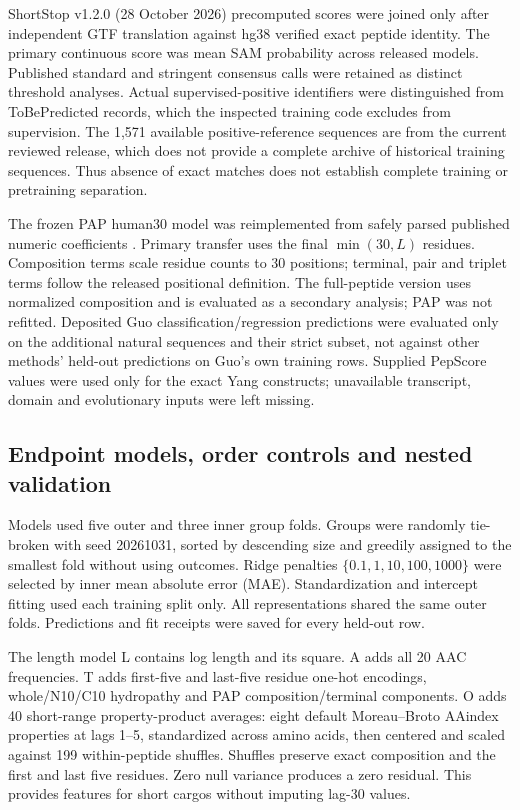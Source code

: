\documentclass[11pt,a4paper]{article}
\begin{document}
ShortStop v1.2.0 (28 October 2026) precomputed scores were joined only after
independent GTF translation against hg38 verified exact peptide identity.
The primary continuous score was mean SAM probability across released models.
Published standard and stringent consensus calls were retained as distinct
threshold analyses. Actual supervised-positive identifiers were distinguished
from ToBePredicted records, which the inspected training code excludes from
supervision. The 1,571 available positive-reference sequences are from the current reviewed release, which does not provide a complete archive of historical training sequences. Thus absence
of exact matches does not establish complete training or pretraining separation.

The frozen PAP human30 model was reimplemented from safely parsed published
numeric coefficients \cite{voutsinos}. Primary transfer uses the final
$\min(30,L)$ residues. Composition terms scale residue counts to 30 positions;
terminal, pair and triplet terms follow the released positional definition.
The full-peptide version uses normalized composition and is evaluated as a secondary analysis; PAP was not refitted. Deposited Guo classification/regression predictions
were evaluated only on the additional natural sequences and their strict
subset, not against other methods' held-out predictions on Guo's own training
rows. Supplied PepScore values were used only for the exact Yang constructs;
unavailable transcript, domain and evolutionary inputs were left missing.

\subsection{Endpoint models, order controls and nested validation}
Models used five outer and three inner group folds. Groups were randomly
tie-broken with seed 20261031, sorted by descending size and greedily assigned
to the smallest fold without using outcomes. Ridge penalties
$\{0.1,1,10,100,1000\}$ were selected by inner mean absolute error (MAE).
Standardization and intercept fitting used each training split only.
All representations shared the same outer folds. Predictions and fit receipts
were saved for every held-out row.

The length model L contains log length and its square. A adds all 20 AAC
frequencies. T adds first-five and last-five residue one-hot encodings,
whole/N10/C10 hydropathy and PAP composition/terminal components. O adds 40
short-range property-product averages: eight default Moreau--Broto AAindex
properties at lags 1--5, standardized across amino acids, then centered and
scaled against 199 within-peptide shuffles. Shuffles preserve exact composition
and the first and last five residues. Zero null variance produces a zero
residual. This provides features for short cargos without imputing lag-30 values.
\end{document}
